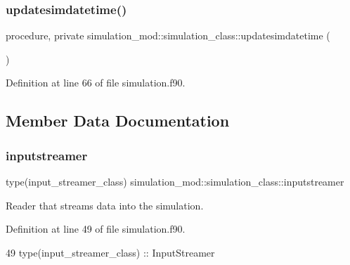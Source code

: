 \subsubsection{\texorpdfstring{updatesimdatetime()}{updatesimdatetime()}}
{\footnotesize\ttfamily procedure, private simulation\+\_\+mod\+::simulation\+\_\+class\+::updatesimdatetime (\begin{DoxyParamCaption}{ }\end{DoxyParamCaption})\hspace{0.3cm}{\ttfamily [private]}}



Definition at line 66 of file simulation.\+f90.



\subsection{Member Data Documentation}
\mbox{\label{structsimulation__mod_1_1simulation__class_a40add8001e631510e3530931b9a9d06a}} 
\subsubsection{\texorpdfstring{inputstreamer}{inputstreamer}}
{\footnotesize\ttfamily type(input\+\_\+streamer\+\_\+class) simulation\+\_\+mod\+::simulation\+\_\+class\+::inputstreamer\hspace{0.3cm}{\ttfamily [private]}}



Reader that streams data into the simulation. 



Definition at line 49 of file simulation.\+f90.


\begin{DoxyCode}
49         \textcolor{keywordtype}{type}(input\_streamer\_class)  :: InputStreamer
\end{DoxyCode}
\mbox{\label{structsimulation__mod_1_1simulation__class_a75e838871eedd2fd66dc7d9bfce015ad}} 
